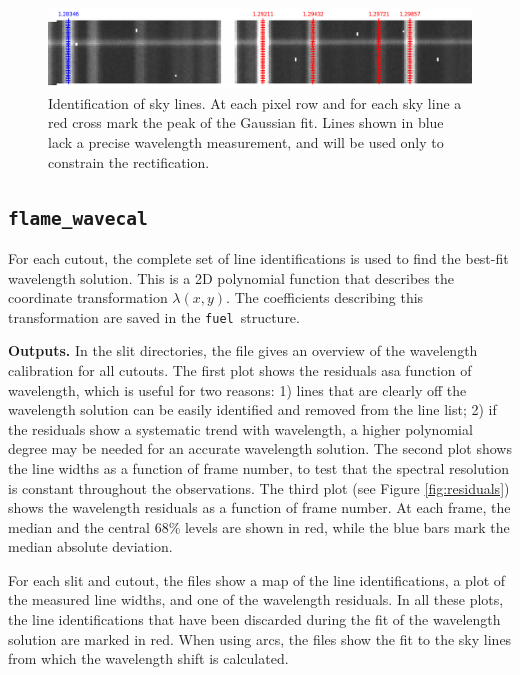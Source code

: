 \documentclass[a4paper]{article}
\newcommand{\fuel}{\texttt{fuel}}
\begin{document}
\begin{sloppypar}
\begin{figure}[tbp]
\centering
\includegraphics[width=\textwidth]{speclines.png}
\caption{Identification of sky lines. At each pixel row and for each sky line a red cross mark the peak of the Gaussian fit. Lines shown in blue lack a precise wavelength measurement, and will be used only to constrain the rectification.}
\label{fig:speclines}
\end{figure}


\subsection{\texttt{flame\_wavecal}}

For each cutout, the complete set of line identifications is used to find the best-fit wavelength solution. This is a 2D polynomial function that describes the coordinate transformation $\lambda(x,y)$. The coefficients describing this transformation are saved in the \fuel\ structure.

\medskip
\noindent
\textbf{Outputs.} In the slit directories, the file  gives an overview of the wavelength calibration for all cutouts. The first plot shows the residuals asa function of wavelength, which is useful for two reasons: 1) lines that are clearly off the wavelength solution can be easily identified and removed from the line list; 2) if the residuals show a systematic trend with wavelength, a higher polynomial degree may be needed for an accurate wavelength solution. The second plot shows the line widths as a function of frame number, to test that the spectral resolution is constant throughout the observations. The third plot (see Figure \ref{fig:residuals}) shows the wavelength residuals as a function of frame number. At each frame, the median and the central 68\% levels are shown in red, while the blue bars mark the median absolute deviation.

For each slit and cutout, the  files show a map of the line identifications, a plot of the measured line widths, and one of the wavelength residuals. In all these plots, the line identifications that have been discarded during the fit of the wavelength solution are marked in red. When using arcs, the  files show the fit to the sky lines from which the wavelength shift is calculated.


\end{sloppypar}
\end{document}
